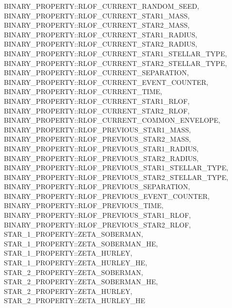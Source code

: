 \hfill
\begin{minipage}{\dimexpr\textwidth-2em}
    BINARY\_PROPERTY::RLOF\_CURRENT\_RANDOM\_SEED, \\
    BINARY\_PROPERTY::RLOF\_CURRENT\_STAR1\_MASS, \\
    BINARY\_PROPERTY::RLOF\_CURRENT\_STAR2\_MASS, \\
    BINARY\_PROPERTY::RLOF\_CURRENT\_STAR1\_RADIUS, \\
    BINARY\_PROPERTY::RLOF\_CURRENT\_STAR2\_RADIUS, \\
    BINARY\_PROPERTY::RLOF\_CURRENT\_STAR1\_STELLAR\_TYPE, \\
    BINARY\_PROPERTY::RLOF\_CURRENT\_STAR2\_STELLAR\_TYPE, \\
    BINARY\_PROPERTY::RLOF\_CURRENT\_SEPARATION, \\
    BINARY\_PROPERTY::RLOF\_CURRENT\_EVENT\_COUNTER, \\
    BINARY\_PROPERTY::RLOF\_CURRENT\_TIME, \\
    BINARY\_PROPERTY::RLOF\_CURRENT\_STAR1\_RLOF, \\
    BINARY\_PROPERTY::RLOF\_CURRENT\_STAR2\_RLOF, \\
    BINARY\_PROPERTY::RLOF\_CURRENT\_COMMON\_ENVELOPE, \\
    BINARY\_PROPERTY::RLOF\_PREVIOUS\_STAR1\_MASS, \\
    BINARY\_PROPERTY::RLOF\_PREVIOUS\_STAR2\_MASS, \\
    BINARY\_PROPERTY::RLOF\_PREVIOUS\_STAR1\_RADIUS, \\
    BINARY\_PROPERTY::RLOF\_PREVIOUS\_STAR2\_RADIUS, \\
    BINARY\_PROPERTY::RLOF\_PREVIOUS\_STAR1\_STELLAR\_TYPE, \\
    BINARY\_PROPERTY::RLOF\_PREVIOUS\_STAR2\_STELLAR\_TYPE, \\
    BINARY\_PROPERTY::RLOF\_PREVIOUS\_SEPARATION, \\
    BINARY\_PROPERTY::RLOF\_PREVIOUS\_EVENT\_COUNTER, \\
    BINARY\_PROPERTY::RLOF\_PREVIOUS\_TIME, \\
    BINARY\_PROPERTY::RLOF\_PREVIOUS\_STAR1\_RLOF, \\
    BINARY\_PROPERTY::RLOF\_PREVIOUS\_STAR2\_RLOF, \\
    STAR\_1\_PROPERTY::ZETA\_SOBERMAN, \\
    STAR\_1\_PROPERTY::ZETA\_SOBERMAN\_HE, \\
    STAR\_1\_PROPERTY::ZETA\_HURLEY, \\
    STAR\_1\_PROPERTY::ZETA\_HURLEY\_HE, \\
    STAR\_2\_PROPERTY::ZETA\_SOBERMAN, \\
    STAR\_2\_PROPERTY::ZETA\_SOBERMAN\_HE, \\
    STAR\_2\_PROPERTY::ZETA\_HURLEY, \\
    STAR\_2\_PROPERTY::ZETA\_HURLEY\_HE
\end{minipage}
\par\rcb{;}

